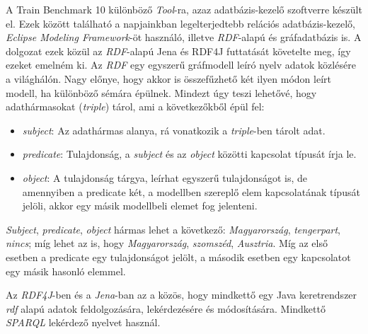 A Train Benchmark 10 különböző \emph{Tool}-ra, azaz adatbázis-kezelő szoftverre készült el. Ezek között található a napjainkban legelterjedtebb relációs adatbázis-kezelő, \emph{Eclipse Modeling Framework}-öt használó, illetve \emph{RDF}-alapú és gráfadatbázis is. A dolgozat ezek közül az \emph{RDF}-alapú Jena és  RDF4J futtatását követelte meg, így ezeket emelném ki. Az \emph{RDF} egy egyszerű gráfmodell leíró nyelv adatok közlésére a világhálón. Nagy előnye, hogy akkor is összefűzhető két ilyen módon leírt modell, ha különböző sémára épülnek. Mindezt úgy teszi lehetővé, hogy adathármasokat (\emph{triple}) tárol, ami a következőkből épül fel:
\begin{itemize}
	\item \emph{subject}: Az adathármas alanya, rá vonatkozik a \emph{triple}-ben tárolt adat.
	\item \emph{predicate}: Tulajdonság, a \emph{subject} és az \emph{object} közötti kapcsolat típusát írja le.
	\item \emph{object}: A tulajdonság tárgya, leírhat egyszerű tulajdonságot is, de amennyiben a predicate két, a modellben szereplő elem kapcsolatának típusát jelöli, akkor egy másik modellbeli elemet fog jelenteni.
\end{itemize}

\emph{Subject}, \emph{predicate}, \emph{object} hármas lehet a következő: \emph{Magyarország}, \emph{tengerpart}, \emph{nincs}; míg lehet az is, hogy \emph{Magyarország}, \emph{szomszéd}, \emph{Ausztria}. Míg az első esetben a predicate egy tulajdonságot jelölt, a második esetben egy kapcsolatot egy másik hasonló elemmel.

Az \emph{RDF4J}-ben és a \emph{Jena}-ban az a közös, hogy mindkettő egy Java keretrendszer \emph{rdf} alapú adatok feldolgozására, lekérdezésére és módosítására. Mindkettő \emph{SPARQL} lekérdező nyelvet használ.